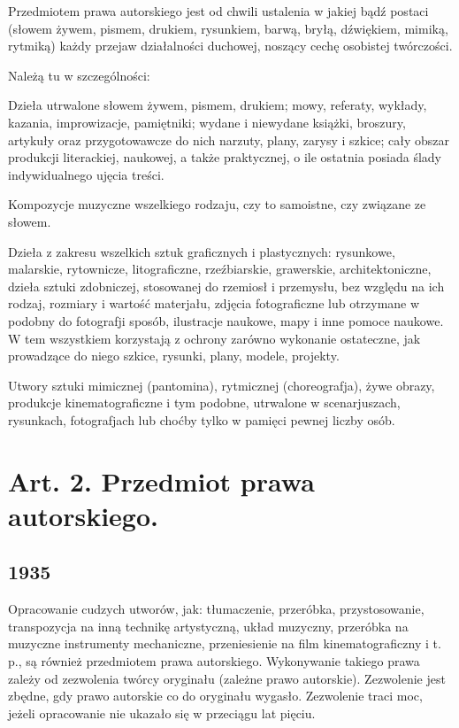 \documentclass[withmarginpar]{book}
\begin{document}
Przedmiotem prawa autorskiego jest od chwili ustalenia w jakiej bądź
postaci (słowem żywem, pismem, drukiem, rysunkiem, barwą, bryłą,
dźwiękiem, mimiką, rytmiką) każdy przejaw działalności duchowej,
noszący cechę osobistej twórczości.

Należą tu w szczególności: 

Dzieła utrwalone słowem żywem, pismem,
drukiem; mowy, referaty, wykłady, kazania, improwizacje, pamiętniki;
wydane i niewydane książki, broszury, artykuły oraz przygotowawcze do
nich narzuty, plany, zarysy i szkice; cały obszar produkcji
literackiej, naukowej, a także praktycznej, o ile ostatnia posiada
ślady indywidualnego ujęcia treści.

Kompozycje muzyczne wszelkiego rodzaju, czy to samoistne, czy związane ze słowem.

Dzieła z zakresu wszelkich sztuk graficznych i plastycznych:
rysunkowe, malarskie, rytownicze, litograficzne, rzeźbiarskie,
grawerskie, architektoniczne, dzieła sztuki zdobniczej, stosowanej do
rzemiosł i przemysłu, bez względu na ich rodzaj, rozmiary i wartość
materjału, zdjęcia fotograficzne lub otrzymane w podobny do fotografji
sposób, ilustracje naukowe, mapy i inne pomoce naukowe. W tem
wszystkiem korzystają z ochrony zarówno wykonanie ostateczne, jak
prowadzące do niego szkice, rysunki, plany, modele, projekty.

Utwory sztuki mimicznej (pantomina), rytmicznej (choreografja), żywe
obrazy, produkcje kinematograficzne i tym podobne, utrwalone w
scenarjuszach, rysunkach, fotografjach lub choćby tylko w pamięci
pewnej liczby osób.

\section{Art. 2.  Przedmiot prawa autorskiego.}
\label{sec:art.-2}

\subsection{1935}
\label{sec:art.-2-1}


Opracowanie cudzych utworów, jak: tłumaczenie, przeróbka,
przystosowanie, transpozycja na inną technikę artystyczną, układ
muzyczny, przeróbka na muzyczne instrumenty mechaniczne, przeniesienie
na film kinematograficzny i t. p., są również przedmiotem prawa
autorskiego. Wykonywanie takiego prawa zależy od zezwolenia twórcy
oryginału (zależne prawo autorskie). Zezwolenie jest zbędne, gdy prawo
autorskie co do oryginału wygasło. Zezwolenie traci moc, jeżeli
opracowanie nie ukazało się w przeciągu lat pięciu.
\end{document}
